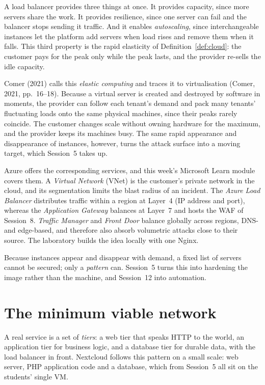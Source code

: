 A load balancer provides three things at once. It provides capacity, since
more servers share the work. It provides resilience, since one server can
fail and the balancer stops sending it traffic. And it enables
\emph{autoscaling}, since interchangeable instances let the platform add
servers when load rises and remove them when it falls. This third property
is the rapid elasticity of Definition~\ref{def:cloud}: the customer pays for
the peak only while the peak lasts, and the provider re-sells the idle
capacity.

Comer (2021) calls this \emph{elastic computing} and traces it to
virtualisation (Comer, 2021, pp.~16--18). Because a virtual server is
created and destroyed by software in moments, the provider can follow each
tenant's demand and pack many tenants' fluctuating loads onto the same
physical machines, since their peaks rarely coincide. The customer changes
scale without owning hardware for the maximum, and the provider keeps its
machines busy. The same rapid appearance and disappearance of instances,
however, turns the attack surface into a moving target, which Session~5
takes up.

Azure offers the corresponding services, and this week's Microsoft Learn
module covers them. A \emph{Virtual Network} (VNet) is the customer's
private network in the cloud, and its segmentation limits the blast radius
of an incident. The \emph{Azure Load Balancer} distributes traffic within a
region at Layer~4 (IP address and port), whereas the \emph{Application
Gateway} balances at Layer~7 and hosts the WAF of Session~8. \emph{Traffic
Manager} and \emph{Front Door} balance globally across regions, DNS- and
edge-based, and therefore also absorb volumetric attacks close to their
source. The laboratory builds the idea locally with one Nginx.

Because instances appear and disappear with demand, a fixed list of servers
cannot be secured; only a \emph{pattern} can. Session~5 turns this into
hardening the image rather than the machine, and Session~12 into automation.

\section{The minimum viable network}

A real service is a set of \emph{tiers}: a web tier that speaks HTTP to the
world, an application tier for business logic, and a database tier for
durable data, with the load balancer in front. Nextcloud follows this
pattern on a small scale: web server, PHP application code and a database,
which from Session~5 all sit on the students' single VM.

